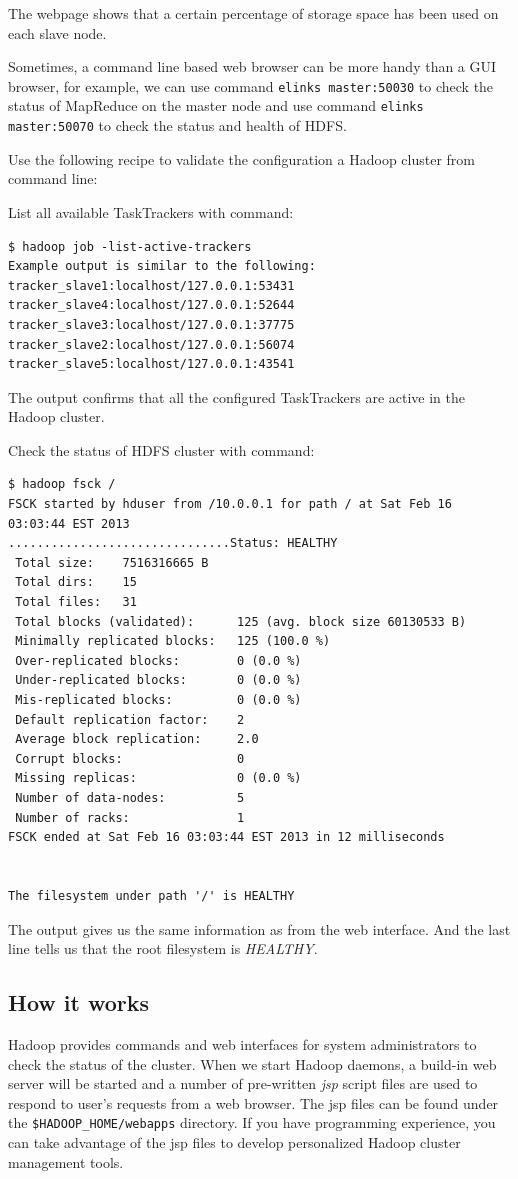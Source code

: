 
The webpage shows that a certain percentage of storage space has been used on each slave node.

Sometimes, a command line based web browser can be more handy than a GUI browser, for example, we can use command \verb|elinks master:50030| to check the status of MapReduce on the master node and use command \verb|elinks master:50070| to check the status and health of HDFS.

Use the following recipe to validate the configuration a Hadoop cluster from command line:

List all available TaskTrackers with command:
\begin{verbatim}
$ hadoop job -list-active-trackers
Example output is similar to the following:
tracker_slave1:localhost/127.0.0.1:53431
tracker_slave4:localhost/127.0.0.1:52644
tracker_slave3:localhost/127.0.0.1:37775
tracker_slave2:localhost/127.0.0.1:56074
tracker_slave5:localhost/127.0.0.1:43541
\end{verbatim}

The output confirms that all the configured TaskTrackers are active in the Hadoop cluster.

Check the status of HDFS cluster with command:
\begin{verbatim}
$ hadoop fsck /
FSCK started by hduser from /10.0.0.1 for path / at Sat Feb 16 03:03:44 EST 2013
...............................Status: HEALTHY
 Total size:    7516316665 B
 Total dirs:    15
 Total files:   31
 Total blocks (validated):      125 (avg. block size 60130533 B)
 Minimally replicated blocks:   125 (100.0 %)
 Over-replicated blocks:        0 (0.0 %)
 Under-replicated blocks:       0 (0.0 %)
 Mis-replicated blocks:         0 (0.0 %)
 Default replication factor:    2
 Average block replication:     2.0
 Corrupt blocks:                0
 Missing replicas:              0 (0.0 %)
 Number of data-nodes:          5
 Number of racks:               1
FSCK ended at Sat Feb 16 03:03:44 EST 2013 in 12 milliseconds


The filesystem under path '/' is HEALTHY
\end{verbatim}

The output gives us the same information as from the web interface. And the last line tells us that the root filesystem is \emph{HEALTHY}.
\subsection*{How it works}
Hadoop provides commands and web interfaces for system administrators to check the status of the cluster. When we start Hadoop daemons, a build-in web server will be started and a number of pre-written \emph{jsp} script files are used to respond to user's requests from a web browser. The jsp files can be found under the \verb|$HADOOP_HOME/webapps| directory. If you have programming experience, you can take advantage of the jsp files to develop personalized Hadoop cluster management tools.

